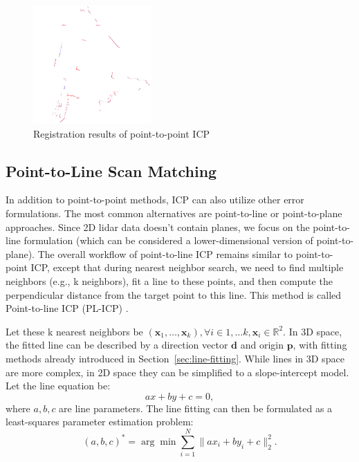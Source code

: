 \begin{figure}[!htp]
	\centering
	\includegraphics[width=0.4\textwidth]{resources/2d-lidar-mapping/2dicp-s2s}
	\caption{Registration results of point-to-point ICP}
	\label{fig:2dicp-s2s}
\end{figure}

\subsection{Point-to-Line Scan Matching}  
In addition to point-to-point methods, ICP can also utilize other error formulations. The most common alternatives are point-to-line or point-to-plane approaches. Since 2D lidar data doesn't contain planes, we focus on the point-to-line formulation (which can be considered a lower-dimensional version of point-to-plane). The overall workflow of point-to-line ICP remains similar to point-to-point ICP, except that during nearest neighbor search, we need to find multiple neighbors (e.g., k neighbors), fit a line to these points, and then compute the perpendicular distance from the target point to this line. This method is called Point-to-line ICP (PL-ICP) \cite{Censi2008}.

Let these k nearest neighbors be $(\mathbf{x}_1, \ldots, \mathbf{x}_k), \forall i \in 1, \ldots k, \mathbf{x}_i \in \mathbb{R}^2$. In 3D space, the fitted line can be described by a direction vector $\mathbf{d}$ and origin $\mathbf{p}$, with fitting methods already introduced in Section~\ref{sec:line-fitting}. While lines in 3D space are more complex, in 2D space they can be simplified to a slope-intercept model. Let the line equation be:
\begin{equation}\label{key}
	a x + by + c = 0,
\end{equation}
where $a,b,c$ are line parameters. The line fitting can then be formulated as a least-squares parameter estimation problem:
\begin{equation}\label{key}
	(a,b,c)^* = \arg \min \sum_{i=1}^N \| a x_i + by_i + c \|_2^2 .
\end{equation}

